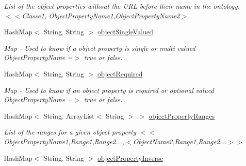 \begin{DoxyCompactItemize}
\begin{DoxyCompactList}\small\item\em List of the object properties without the URL before their name in the ontology.  $<$$<$Classe1, ObjectPropertyName1,ObjectPropertyName2$>$ \end{DoxyCompactList}\item 
\hypertarget{class_data_base_1_1_tables_ae379376430f85d3c7cef16bf1a962ff1}{
HashMap$<$ String, String $>$ \hyperlink{class_data_base_1_1_tables_ae379376430f85d3c7cef16bf1a962ff1}{objectSingleValued}}
\label{class_data_base_1_1_tables_ae379376430f85d3c7cef16bf1a962ff1}

\begin{DoxyCompactList}\small\item\em Map -\/ Used to know if a object property is single or multi valued  ObjectPropertyName =$>$ true or false. \end{DoxyCompactList}\item 
\hypertarget{class_data_base_1_1_tables_a11874c966b0f22fc88b7fb46cb3331ed}{
HashMap$<$ String, String $>$ \hyperlink{class_data_base_1_1_tables_a11874c966b0f22fc88b7fb46cb3331ed}{objectRequired}}
\label{class_data_base_1_1_tables_a11874c966b0f22fc88b7fb46cb3331ed}

\begin{DoxyCompactList}\small\item\em Map -\/ Used to know if an object property is required or optional valued  ObjectPropertyName =$>$ true or false. \end{DoxyCompactList}\item 
\hypertarget{class_data_base_1_1_tables_af580afd6f42aac3503cecab2e615ef73}{
HashMap$<$ String, ArrayList$<$ String $>$ $>$ \hyperlink{class_data_base_1_1_tables_af580afd6f42aac3503cecab2e615ef73}{objectPropertyRanges}}
\label{class_data_base_1_1_tables_af580afd6f42aac3503cecab2e615ef73}

\begin{DoxyCompactList}\small\item\em List of the ranges for a given object property  $<$$<$ObjectPropertyName1,Range1,Range2...,$<$ObjectName2,Range1,Range2...$>$$>$ \end{DoxyCompactList}\item 
\hypertarget{class_data_base_1_1_tables_a0465d81797980577fb423e6140df7110}{
HashMap$<$ String, String $>$ \hyperlink{class_data_base_1_1_tables_a0465d81797980577fb423e6140df7110}{objectPropertyInverse}}
\label{class_data_base_1_1_tables_a0465d81797980577fb423e6140df7110}


\end{DoxyCompactItemize}
